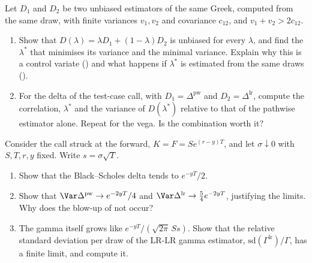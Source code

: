 \begin{exercise}\label{ex:gr-combination}
\easy Let $D_1$ and $D_2$ be two unbiased estimators of the same Greek, computed from the same
draw, with finite variances $v_1,v_2$ and covariance $c_{12}$, and $v_1+v_2>2c_{12}$.
\begin{enumerate}[label=(\alph*)]
  \item Show that $D(\lambda)=\lambda D_1+(1-\lambda)D_2$ is unbiased for every $\lambda$, and
    find the $\lambda^*$ that minimises its variance and the minimal variance. Explain why this
    is a control variate () and what happens if $\lambda^*$ is estimated
    from the same draws ().
  \item For the delta of the test-case call, with $D_1=\Delta^{\mathrm{pw}}$ and
    $D_2=\Delta^{\mathrm{lr}}$, compute the correlation, $\lambda^*$ and the variance of
    $D(\lambda^*)$ relative to that of the pathwise estimator alone. Repeat for the vega. Is the
    combination worth it?
\end{enumerate}
\end{exercise}

\begin{exercise}\label{ex:gr-small-vol}
\medium Consider the call struck at the forward, $K=F=Se^{(r-y)T}$, and let $\sigma\downarrow0$
with $S,T,r,y$ fixed. Write $s=\sigma\sqrt T$.
\begin{enumerate}[label=(\alph*)]
  \item Show that the Black--Scholes delta tends to $e^{-yT}/2$.
  \item Show that $\Var\Delta^{\mathrm{pw}}\to e^{-2yT}/4$ and $\Var\Delta^{\mathrm{lr}}\to\frac54e^{-2yT}$,
    justifying the limits. Why does the blow-up of  not occur?
  \item The gamma itself grows like $e^{-yT}/(\sqrt{2\pi}\,Ss)$. Show that the relative standard
    deviation per draw of the LR-LR gamma estimator, $\mathrm{sd}(\Gamma^{\mathrm{lr}})/\Gamma$, has
    a finite limit, and compute it.
\end{enumerate}
\end{exercise}

